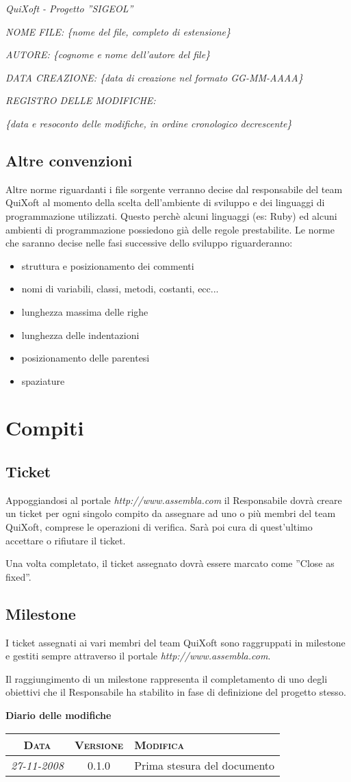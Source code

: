 \documentclass[11pt,a4paper]{article}
\newcommand{\modifiche} 
{
\newpage
\begin{center}
\textbf{Diario delle modifiche} \\
\bigskip
\begin{tabular}{|c|c|p{0.51\textwidth}|}
\hline
\textsc{Data} & \textsc{Versione} & \textsc{Modifica} \\
\hline
\hline
\textit{27-11-2008} & 0.1.0 & Prima stesura del documento \\
\hline
\end{tabular}
\end{center}
}
\begin{document}
\textit{QuiXoft - Progetto ''SIGEOL''}

\textit{NOME FILE: \{nome del file, completo di estensione\}}

\textit{AUTORE: \{cognome e nome dell'autore del file\}}

\textit{DATA CREAZIONE: \{data di creazione nel formato GG-MM-AAAA\}}

\textit{REGISTRO DELLE MODIFICHE:}

\textit{\{data e resoconto delle modifiche, in ordine cronologico decrescente\}}
\subsection{Altre convenzioni}
Altre norme riguardanti i file sorgente verranno decise dal responsabile del team QuiXoft al momento della scelta dell'ambiente di sviluppo e dei linguaggi di programmazione utilizzati. Questo perchè alcuni linguaggi (es: Ruby) ed alcuni ambienti di programmazione possiedono già delle regole prestabilite. Le norme che saranno decise nelle fasi successive dello sviluppo riguarderanno:
\begin{itemize}
	\item struttura e posizionamento dei commenti
	\item nomi di variabili, classi, metodi, costanti, ecc...
	\item lunghezza massima delle righe
	\item lunghezza delle indentazioni
	\item posizionamento delle parentesi
	\item spaziature
\end{itemize}
\section{Compiti}
\subsection{Ticket}
Appoggiandosi al portale \textit{http://www.assembla.com} il Responsabile dovrà creare un ticket per ogni singolo compito da assegnare ad uno o più membri del team QuiXoft, comprese le operazioni di verifica.
Sarà poi cura di quest'ultimo accettare o rifiutare il ticket.

Una volta completato, il ticket assegnato dovrà essere marcato come ''Close as fixed''.
\subsection{Milestone}
I ticket assegnati ai vari membri del team QuiXoft sono raggruppati in milestone e gestiti sempre attraverso il portale \textit{http://www.assembla.com}.

Il raggiungimento di un milestone rappresenta il completamento di uno degli obiettivi che il Responsabile ha stabilito in fase di definizione del progetto stesso.
\modifiche
\end{document}
